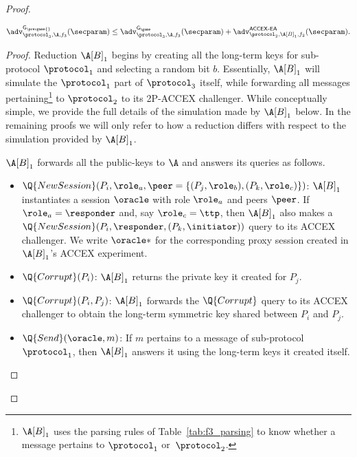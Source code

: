 \begin{proof}
\begin{lemma}\label{lemma:ACCEX-EA}
$
	\adv_{\protocol_3,\A,f_3}^{\mathsf{G_{\prevgame{}}}}(\secparam) 
	\leq \adv_{\protocol_3,\A,f_3}^{\mathsf{G_\game}}(\secparam) 
	+ \adv_{\protocol_2,\A[B]_1, f_2}^{\operatorname{\mathsf{ACCEX-EA}}}(\secparam)  .
$
\end{lemma}

\begin{proof}

Reduction $\A[B]_1$ begins by creating all the long-term keys for sub-protocol $\protocol_1$ and selecting a random bit $b$.
Essentially,
$\A[B]_1$ will simulate the $\protocol_1$ part of $\protocol_3$ itself,
while forwarding all messages pertaining\footnote{$\A[B]_1$ uses the parsing rules of Table~\ref{tab:f3_parsing} to
know whether a message pertains to $\protocol_1$ or~$\protocol_2$.
} 
to $\protocol_2$ to its 2P-ACCEX challenger.
While conceptually simple,
we provide the full details of the simulation made by $\A[B]_1$ below.
In the remaining proofs we will only refer to how a reduction differs with respect to the simulation provided by $\A[B]_1$.


\small
$\A[B]_1$ forwards all the public-keys to $\A$ and answers its queries as follows.
\begin{itemize}
	\item $\Q{NewSession}(P_i, \role_a, \peer = \lbrace (P_j, \role_b), (P_k, \role_c) \rbrace)$: 
	$\A[B]_1$ instantiates a session $\oracle$	with role $\role_a$ and peers $\peer$.	
	If $\role_a = \responder$ and,
	say $\role_c = \ttp$,
	then $\A[B]_1$ also makes a $\Q{NewSession}(P_i,\responder, (P_k, \initiator))$ query to its ACCEX challenger.
	We write $\oracle*$ for the corresponding proxy session created in $\A[B]_1$'s ACCEX experiment.
 



	\item $\Q{Corrupt}(P_i)$: 
	$\A[B]_1$ returns the private key it created for $P_j$.
	
	\item $\Q{Corrupt}(P_i, P_j)$: 	
 	$\A[B]_1$ forwards the $\Q{Corrupt}$ query to its ACCEX challenger to obtain the long-term symmetric key shared between $P_i$ and $P_j$.
		 	
	
	\item $\Q{Send}(\oracle, m)$: 
	If 	$m$ pertains to a message of sub-protocol $\protocol_1$,
	then $\A[B]_1$ answers it using the long-term keys it created itself. 
	

\end{itemize}
\end{proof}
\end{proof}
